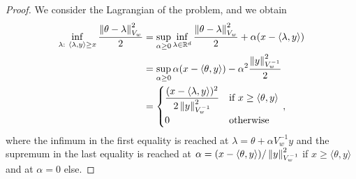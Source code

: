 \begin{proof}
We consider the Lagrangian of the problem, and we obtain
\begin{align*}
  \inf_{\lambda:\ \langle \lambda,y \rangle \geq x} \frac{\left\lVert\theta-\lambda\right\rVert^2_{V_w}}{2}
  &= \sup_{\alpha \geq 0}\inf_{\lambda \in \mathbb{R}^d} \frac{\left\lVert\theta-\lambda\right\rVert^2_{V_w}}{2}+ \alpha (x-\langle\lambda,y\rangle)\\
  &=  \sup_{\alpha \geq 0} \alpha (x-\langle\theta,y\rangle) - \alpha^2 \frac{\left\lVert y\right\rVert^2_{V_w^{-1}}}{2}\\
  &= \begin{cases}
  \dfrac{(x - \langle\lambda,y\rangle)^2}{2 \left\lVert y\right\rVert_{V_w^{-1}}^2} &\text{if } x \geq \langle\theta,y\rangle \\
  0 & \text{otherwise}
  \end{cases}\,,
\end{align*}
where the infimum in the first equality is reached at $\lambda = \theta + \alpha V_w^{-1} y$ and the supremum in the last equality is reached at $\alpha = (x- \langle\theta,y\rangle)/\left\lVert y\right\rVert_{V_w^{-1}}^2$ if $x \geq \langle\theta,y\rangle$ and at $\alpha = 0$ else.
\end{proof}

